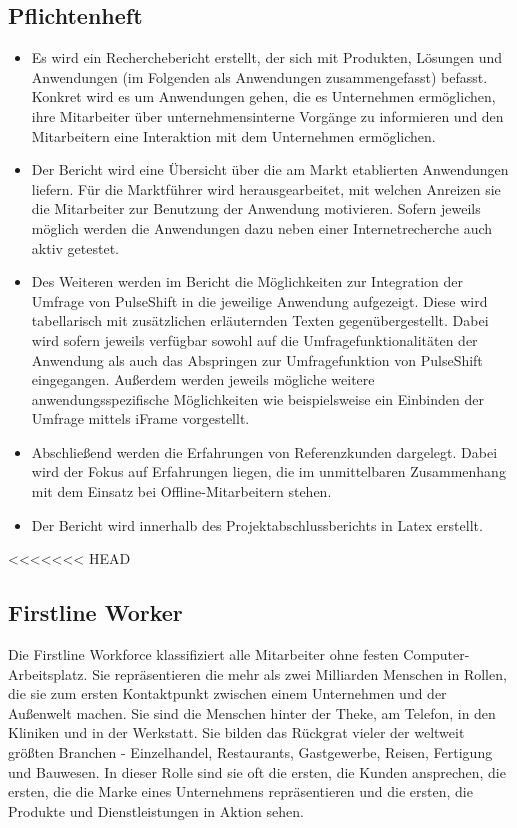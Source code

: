 \subsection{Pflichtenheft}
\begin{itemize}
\item Es wird ein Recherchebericht erstellt, der sich mit Produkten, Lösungen und Anwendungen (im Folgenden als Anwendungen zusammengefasst) befasst. Konkret wird es um Anwendungen gehen, die es Unternehmen ermöglichen, ihre Mitarbeiter über unternehmensinterne Vorgänge zu informieren und den Mitarbeitern eine Interaktion mit dem Unternehmen ermöglichen.
\item Der Bericht wird eine Übersicht über die am Markt etablierten Anwendungen liefern. Für die Marktführer wird herausgearbeitet, mit welchen Anreizen sie die Mitarbeiter zur Benutzung der Anwendung motivieren. Sofern jeweils möglich werden die Anwendungen dazu neben einer Internetrecherche auch aktiv getestet.
\item Des Weiteren werden im Bericht die Möglichkeiten zur Integration der Umfrage von PulseShift in die jeweilige Anwendung aufgezeigt. Diese wird tabellarisch mit zusätzlichen erläuternden Texten gegenübergestellt. Dabei wird sofern jeweils verfügbar sowohl auf die Umfragefunktionalitäten der Anwendung als auch das Abspringen zur Umfragefunktion von PulseShift eingegangen. Außerdem werden jeweils mögliche weitere anwendungsspezifische Möglichkeiten wie beispielsweise ein Einbinden der Umfrage mittels iFrame vorgestellt.
\item Abschließend werden die Erfahrungen von Referenzkunden dargelegt. Dabei wird der Fokus auf Erfahrungen liegen, die im unmittelbaren Zusammenhang mit dem Einsatz bei Offline-Mitarbeitern stehen.
\item Der Bericht wird innerhalb des Projektabschlussberichts in Latex erstellt.
\end{itemize}


<<<<<<< HEAD
\subsection{Firstline Worker}

Die Firstline Workforce klassifiziert alle Mitarbeiter ohne festen Computer-Arbeits\-platz. Sie repräsentieren die mehr als zwei Milliarden Menschen  in Rollen, die sie zum ersten Kontaktpunkt zwischen einem Unternehmen und der Außenwelt machen. Sie sind die Menschen hinter der Theke, am Telefon, in den Kliniken und in der Werkstatt. Sie bilden das Rückgrat vieler der weltweit größten Branchen - Einzelhandel, Restaurants, Gastgewerbe, Reisen, Fertigung und Bauwesen. In dieser Rolle sind sie oft die ersten, die Kunden ansprechen, die ersten, die die Marke eines Unternehmens repräsentieren und die ersten, die Produkte und Dienstleistungen in Aktion sehen.


